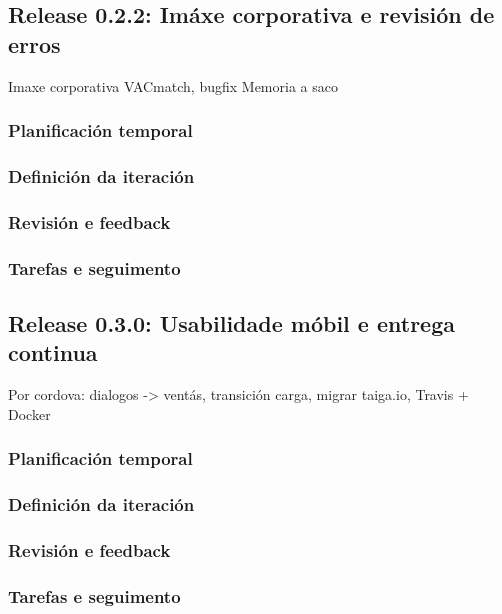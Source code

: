    \subsection{Release 0.2.2: Imáxe corporativa e revisión de erros}
    Imaxe corporativa VACmatch, bugfix
    Memoria a saco
      \subsubsection{Planificación temporal}
      \subsubsection{Definición da iteración}
      \subsubsection{Revisión e feedback}
      \subsubsection{Tarefas e seguimento}

    \subsection{Release 0.3.0: Usabilidade móbil e entrega continua}
    Por cordova: dialogos -> ventás, transición carga, migrar taiga.io, Travis + 
Docker
      \subsubsection{Planificación temporal}
      \subsubsection{Definición da iteración}
      \subsubsection{Revisión e feedback}
      \subsubsection{Tarefas e seguimento}
